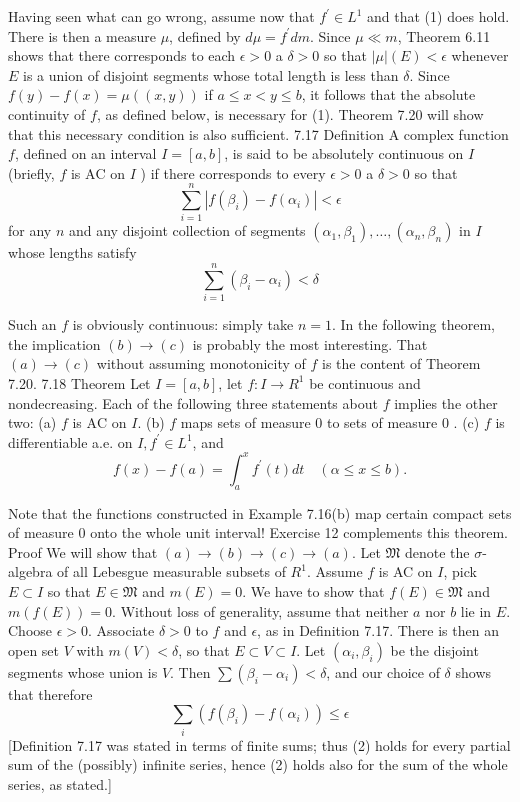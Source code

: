 Having seen what can go wrong, assume now that $f^{\prime} \in L^1$ and that (1) does hold. There is then a measure $\mu$, defined by $d \mu=f^{\prime} d m$. Since $\mu \ll m$, Theorem 6.11 shows that there corresponds to each $\epsilon>0$ a $\delta>0$ so that $|\mu|(E)<\epsilon$ whenever $E$ is a union of disjoint segments whose total length is less than $\delta$. Since $f(y)-f(x)=\mu((x, y))$ if $a \leq x<y \leq b$, it follows that the absolute continuity of $f$, as defined below, is necessary for (1). Theorem 7.20 will show that this necessary condition is also sufficient.
7.17 Definition A complex function $f$, defined on an interval $I=[a, b]$, is said to be absolutely continuous on $I$ (briefly, $f$ is $\mathrm{AC}$ on $I$ ) if there corresponds to every $\epsilon>0$ a $\delta>0$ so that
$$
\sum_{i=1}^n\left|f\left(\beta_i\right)-f\left(\alpha_i\right)\right|<\epsilon
$$
for any $n$ and any disjoint collection of segments $\left(\alpha_1, \beta_1\right), \ldots,\left(\alpha_n, \beta_n\right)$ in $I$ whose lengths satisfy
$$
\sum_{i=1}^n\left(\beta_i-\alpha_i\right)<\delta
$$

Such an $f$ is obviously continuous: simply take $n=1$.
In the following theorem, the implication $(b) \rightarrow(c)$ is probably the most interesting. That $(a) \rightarrow(c)$ without assuming monotonicity of $f$ is the content of Theorem 7.20.
7.18 Theorem Let $I=[a, b]$, let $f: I \rightarrow R^1$ be continuous and nondecreasing. Each of the following three statements about $f$ implies the other two:
(a) $f$ is $\mathrm{AC}$ on $I$.
(b) $f$ maps sets of measure 0 to sets of measure 0 .
(c) $f$ is differentiable a.e. on $I, f^{\prime} \in L^1$, and
$$
f(x)-f(a)=\int_a^x f^{\prime}(t) d t \quad(\alpha \leq x \leq b) .
$$

Note that the functions constructed in Example 7.16(b) map certain compact sets of measure 0 onto the whole unit interval!
Exercise 12 complements this theorem.
Proof We will show that $(a) \rightarrow(b) \rightarrow(c) \rightarrow(a)$.
Let $\mathfrak{M}$ denote the $\sigma$-algebra of all Lebesgue measurable subsets of $R^1$.
Assume $f$ is AC on $I$, pick $E \subset I$ so that $E \in \mathfrak{M}$ and $m(E)=0$. We have to show that $f(E) \in \mathfrak{M}$ and $m(f(E))=0$. Without loss of generality, assume that neither $a$ nor $b$ lie in $E$.
Choose $\epsilon>0$. Associate $\delta>0$ to $f$ and $\epsilon$, as in Definition 7.17. There is then an open set $V$ with $m(V)<\delta$, so that $E \subset V \subset I$. Let $\left(\alpha_i, \beta_i\right)$ be the disjoint segments whose union is $V$. Then $\sum\left(\beta_i-\alpha_i\right)<\delta$, and our choice of $\delta$ shows that therefore
$$
\sum_i\left(f\left(\beta_i\right)-f\left(\alpha_i\right)\right) \leq \epsilon
$$
[Definition 7.17 was stated in terms of finite sums; thus (2) holds for every partial sum of the (possibly) infinite series, hence (2) holds also for the sum of the whole series, as stated.]

